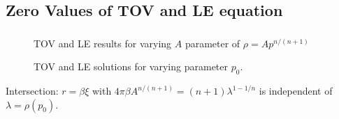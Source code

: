 % 
% 


\subsection{Zero Values of TOV and LE equation}
\begin{frame}
	\frametitle{\insertsubsection}
	\begin{figure}
		\centering
		\caption{TOV and LE results for varying $A$ parameter of $\rho=Ap^{n/(n+1)}$}
	\end{figure}
\end{frame}

\begin{frame}
	\begin{figure}
		\centering
		\caption{TOV and LE solutions for varying parameter $p_0$.}
	\end{figure}
	Intersection: $r=\beta\xi$ with $4\pi\beta A^{n/(n+1)}=(n+1)\lambda^{1-1/n}$ is independent of $\lambda=\rho(p_0)$.
\end{frame}


